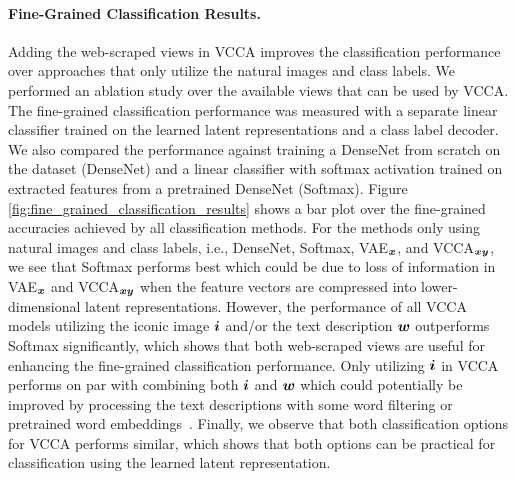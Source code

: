 \vspace{-3mm}
\paragraph{Fine-Grained Classification Results.} Adding the web-scraped views in VCCA improves the classification performance over approaches that only utilize the natural images and class labels. We performed an ablation study over the available views that can be used by VCCA. The fine-grained classification performance was measured with a separate linear classifier trained on the learned latent representations and a class label decoder. We also compared the performance against training a DenseNet from scratch on the dataset (DenseNet) and a linear classifier with softmax activation trained on extracted features from a pretrained DenseNet (Softmax). 
Figure \ref{fig:fine_grained_classification_results} shows a bar plot over the fine-grained accuracies achieved by all classification methods.
For the methods only using natural images and class labels, i.e., DenseNet, Softmax, VAE$_{{\bm{x}}}$, and VCCA$_{{\bm{x}} {\bm{y}}}$, we see that Softmax performs best which could be due to loss of information in VAE$_{{\bm{x}}}$ and VCCA$_{{\bm{x}} {\bm{y}}}$ when the feature vectors are compressed into lower-dimensional latent representations.
However, the performance of all VCCA models utilizing the iconic image ${\bm{i}}$ and/or the text description ${\bm{w}}$ outperforms Softmax significantly, which shows that both web-scraped views are useful for enhancing the fine-grained classification performance.
Only utilizing ${\bm{i}}$ in VCCA performs on par with combining both ${\bm{i}}$ and ${\bm{w}}$ which could potentially be improved by processing the text descriptions with some word filtering or pretrained word embeddings~\cite{mikolov2013distributed, devlin2018bert}. 
Finally, we observe that both classification options for VCCA performs similar, which shows that both options can be practical for classification using the learned latent representation. 


